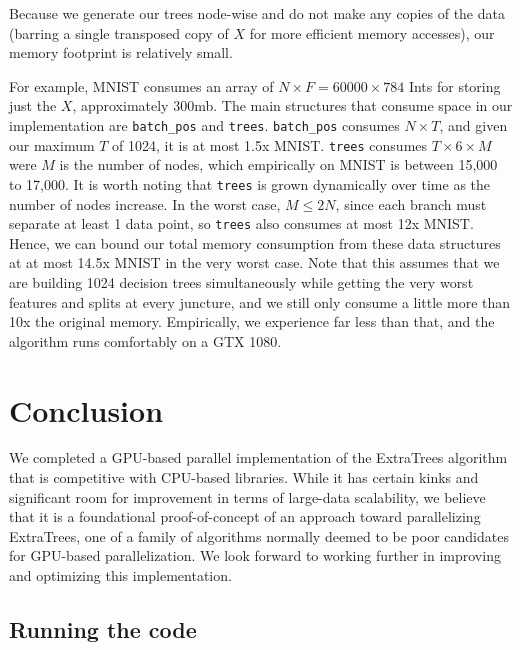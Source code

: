 \documentclass[10pt,conference]{IEEEtran}
\begin{document}
    Because we generate our trees node-wise and do not make any copies of the data (barring a single transposed copy of $X$ for more efficient memory accesses), our memory footprint is relatively small. 
    
    For example, MNIST consumes an array of $N \times F = 60000 \times 784$ Ints for storing just the $X$, approximately 300mb. The main structures that consume space in our implementation are \texttt{batch\_pos} and \texttt{trees}. \texttt{batch\_pos} consumes $N \times T$, and given our maximum $T$ of 1024, it is at most 1.5x MNIST. \texttt{trees} consumes $T \times 6 \times M$ were $M$ is the number of nodes, which empirically on MNIST is between 15,000 to 17,000. It is worth noting that \texttt{trees} is grown dynamically over time as the number of nodes increase. In the worst case, $M\leq 2N$, since each branch must separate at least 1 data point, so \texttt{trees} also consumes at most 12x MNIST. Hence, we can bound our total memory consumption from these data structures at at most 14.5x MNIST in the very worst case. Note that this assumes that we are building 1024 decision trees simultaneously while getting the very worst features and splits at every juncture, and we still only consume a little more than 10x the original memory. Empirically, we experience far less than that, and the algorithm runs comfortably on a GTX 1080.

\section{Conclusion}

We completed a GPU-based parallel implementation of the ExtraTrees algorithm that is competitive with CPU-based libraries. While it has certain kinks and significant room for improvement in terms of large-data scalability, we believe that it is a foundational proof-of-concept of an approach toward parallelizing ExtraTrees, one of a family of algorithms normally deemed to be poor candidates for GPU-based parallelization. We look forward to working further in improving and optimizing this implementation.


\nocite{*}



\appendix

\subsection{\textbf{Running the code}}
\end{document}
